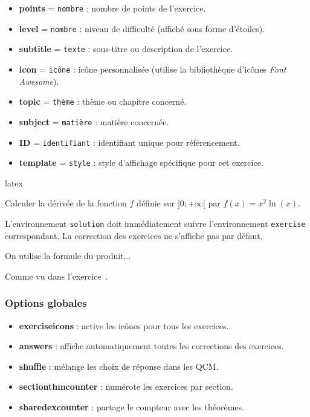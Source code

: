 \documentclass[
    french,
    margin=2cm
]{neoschool}
\begin{document}
\begin{itemize}
\item \textbf{points} = \texttt{nombre} : nombre de points
  de l'exercice.
\item \textbf{level} = \texttt{nombre} : niveau de
  difficulté (affiché sous forme d'étoiles).
\item \textbf{subtitle} = \texttt{texte} : sous-titre ou
  description de l'exercice.
\item \textbf{icon} = \texttt{icône} : icône personnalisée
  (utilise la bibliothèque d'icônes \textit{Font Awesome}).
\item \textbf{topic} = \texttt{thème} : thème ou chapitre
  concerné.
\item \textbf{subject} = \texttt{matière} : matière
  concernée.
\item \textbf{ID} = \texttt{identifiant} : identifiant
  unique pour référencement.
\item \textbf{template} = \texttt{style} : style
  d'affichage spécifique pour cet exercice.
\end{itemize}

\begin{code}{latex}
\begin{exercise}[
    points=4,
    level=2,
    subtitle=Dérivation,
    icon=\faPencil,
    topic=Analyse,
    subject=Mathématiques,
    ID=der01,
    template=elegant-box
]
    Calculer la dérivée de la fonction $f$ définie sur $]0 ; +\infty[$
    par $f(x)=x^2\ln(x)$.
\end{exercise}

L'environnement \texttt{solution} doit immédiatement suivre l'environnement \texttt{exercise} correspondant. La correction des exercices ne s'affiche pas par défaut.

\begin{solution}
    On utilise la formule du produit...
\end{solution}

Comme vu dans l'exercice~.
\end{code}

\subsubsection{Options globales}

\begin{itemize}
\item \textbf{exerciseicons} : active les icônes pour tous les exercices.
\item \textbf{answers} : affiche automatiquement toutes les corrections des exercices.
\item \textbf{shuffle} : mélange les choix de réponse dans les QCM.
\item \textbf{sectionthmcounter} : numérote les exercices par section.
\item \textbf{sharedexcounter} : partage le compteur avec les théorèmes.
\end{itemize}
\end{document}
